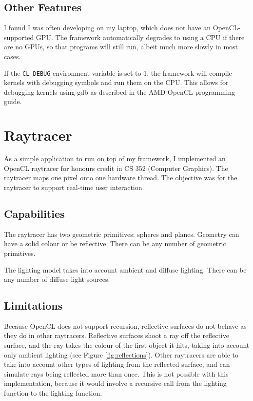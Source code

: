 \documentclass{article}
\begin{document}
\subsection{Other Features}
I found I was often developing on my laptop, which does not have an OpenCL-supported GPU. The framework automatically degrades to using a CPU if there are no GPUs, so that programs will still run, albeit much more slowly in most cases.

If the \texttt{CL\_DEBUG} environment variable is set to 1, the framework will compile kernels with debugging symbols and run them on the CPU. This allows for debugging kernels using gdb as described in the AMD OpenCL programming guide\cite{amdapp}.

\section{Raytracer}
As a simple application to run on top of my framework, I implemented an OpenCL raytracer for honours credit in CS 352 (Computer Graphics). The raytracer maps one pixel onto one hardware thread. The objective was for the raytracer to support real-time user interaction.

\subsection{Capabilities}
The raytracer has two geometric primitives: spheres and planes. Geometry can have a solid colour or be reflective. There can be any number of geometric primitives.

The lighting model takes into account ambient and diffuse lighting. There can be any number of diffuse light sources.

\subsection{Limitations}
Because OpenCL does not support recursion, reflective surfaces do not behave as they do in other raytracers. Reflective surfaces shoot a ray off the reflective surface, and the ray takes the colour of the first object it hits, taking into account only ambient lighting (see Figure \ref{fig:reflections}). Other raytracers are able to take into account other types of lighting from the reflected surface, and can simulate rays being reflected more than once. This is not possible with this implementation, because it would involve a recursive call from the lighting function to the lighting function.
\end{document}
